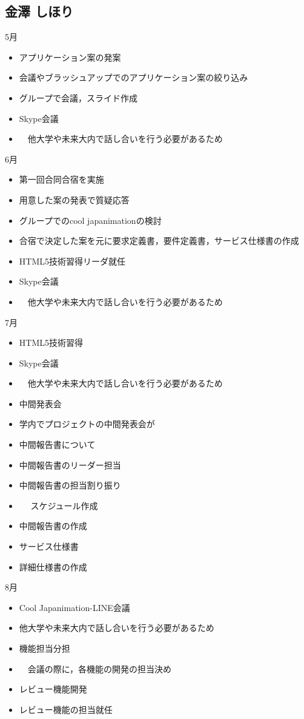 \subsection{金澤 しほり}
5月
\begin{itemize}
\item アプリケーション案の発案
\item 会議やブラッシュアップでのアプリケーション案の絞り込み
\item グループで会議，スライド作成
\item Skype会議
\item 　他大学や未来大内で話し合いを行う必要があるため
\end{itemize}
6月
\begin{itemize}
\item 第一回合同合宿を実施
\item 用意した案の発表で質疑応答
\item グループでのcool japanimationの検討
\item 合宿で決定した案を元に要求定義書，要件定義書，サービス仕様書の作成
\item HTML5技術習得リーダ就任
\item Skype会議
\item 　他大学や未来大内で話し合いを行う必要があるため
\end{itemize}
7月
\begin{itemize}
\item HTML5技術習得
\item Skype会議
\item 　他大学や未来大内で話し合いを行う必要があるため
\item 中間発表会
\item 学内でプロジェクトの中間発表会が
\item 中間報告書について
\item   中間報告書のリーダー担当
\item   中間報告書の担当割り振り
\item　 スケジュール作成
\item   中間報告書の作成
\item サービス仕様書
\item 詳細仕様書の作成
\end{itemize}
8月
\begin{itemize}
\item Cool Japanimation-LINE会議
\item   他大学や未来大内で話し合いを行う必要があるため
\item 機能担当分担
\item 　会議の際に，各機能の開発の担当決め
\item レビュー機能開発
\item   レビュー機能の担当就任
\end{itemize}
